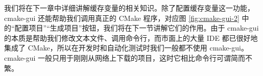 
我们将在下一章中详细讲解缓存变量的相关知识。除了配置缓存变量这一功能，cmake-gui 还能帮助我们调用真正的 CMake 程序，对应图 \ref{fig:cmake-gui-2} 中的“配置项目”“生成项目”按钮，我们将在下一节讲解它们的作用。由于 cmake-gui 的本质是帮助我们修改文本文件、调用命令行，而市面上的大量 IDE 都已很好地集成了 CMake，所以在开发时和自动化测试时我们一般都不使用 cmake-gui。cmake-gui 一般只用于刚刚从网络上下载的项目，这时它相比命令行可谓简而不繁。
